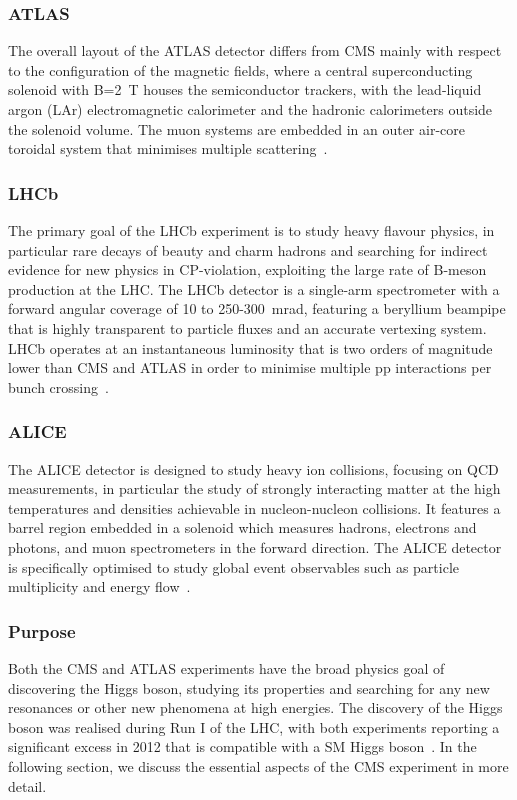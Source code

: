 \subsubsection{ATLAS}
The overall layout of the ATLAS detector differs from CMS mainly with respect to the configuration of the magnetic fields, where a central superconducting solenoid with B=2~T houses the semiconductor trackers, with the lead-liquid argon (LAr) electromagnetic calorimeter and the hadronic calorimeters outside the solenoid volume. The muon systems are embedded in an outer air-core toroidal system that minimises multiple scattering~\cite{Aad:2008zzm}.

\subsubsection{LHCb}
The primary goal of the LHCb experiment is to study heavy flavour physics, in particular rare decays of beauty and charm hadrons and searching for indirect evidence for new physics in CP-violation, exploiting the large rate of B-meson production at the LHC. The LHCb detector is a single-arm spectrometer with a forward angular coverage of 10 to 250-300~mrad, featuring a beryllium beampipe that is highly transparent to particle fluxes and an accurate vertexing system. LHCb operates at an instantaneous luminosity that is two orders of magnitude lower than CMS and ATLAS in order to minimise multiple pp interactions per bunch crossing~\cite{Alves:2008zz}.

\subsubsection{ALICE}
The ALICE detector is designed to study heavy ion collisions, focusing on QCD measurements, in particular the study of strongly interacting matter at the high temperatures and densities achievable in nucleon-nucleon collisions. It features a barrel region embedded in a solenoid which measures hadrons, electrons and photons, and muon spectrometers in the forward direction. The ALICE detector is specifically optimised to study global event observables such as particle multiplicity and energy flow~\cite{Aamodt:2008zz}. 

\subsubsection{Purpose}
Both the CMS and ATLAS experiments have the broad physics goal of discovering the Higgs boson, studying its properties and searching for any new resonances or other new phenomena at high energies. The discovery of the Higgs boson was realised during Run I of the LHC, with both experiments reporting a significant excess in 2012 that is compatible with a SM Higgs boson~\cite{Aad:2012tfa,Chatrchyan:2012xdj}. In the following section, we discuss the essential aspects of the CMS experiment in more detail.

